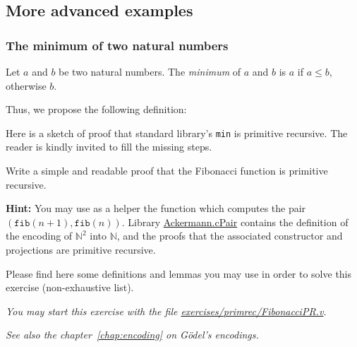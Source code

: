 \subsection{More advanced examples}



\subsubsection{The minimum of two natural numbers}

Let $a$ and $b$ be two natural numbers. The \emph{minimum} of $a$ and $b$ is $a$ if $a \leq b$, otherwise $b$.

Thus, we propose the following definition:


Here is a sketch of proof that standard library's \texttt{min} is
primitive recursive. The reader is kindly invited to fill the missing steps.





\begin{exercise}
Write a simple and readable proof that the Fibonacci function is primitive recursive.




\textbf{Hint:}  You may use as a helper the function which computes the pair \linebreak
$(\texttt{fib}(n+1),\texttt{fib}(n))$. 
Library \href{../theories/html/hydras.Ackermann.cPair.html}{Ackermann.cPair} contains
the definition of the encoding of $\mathbb{N}^2$ into $\mathbb{N}$, and the proofs that 
the associated constructor and projections are primitive recursive.  

Please find here some definitions and lemmas you may use 
in order to solve this exercise (non-exhaustive list).


\emph{You may start this exercise with the file
  \href{https://github.com/coq-community/hydra-battles/blob/master/exercises/primrec/FibonacciPR.v}{exercises/primrec/FibonacciPR.v}.}

\vspace{4pt}

\emph{See also the chapter~\ref{chap:encoding} on G\"{o}del's encodings.}

\end{exercise}

